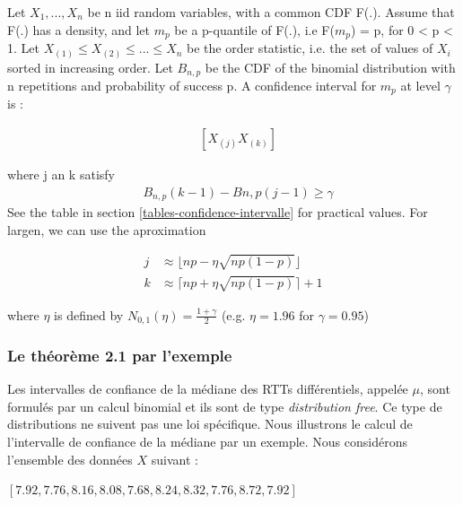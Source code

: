 \begin{tcolorbox}

\begin{theorem}
Let $X_1,..., X_n$ be n iid random variables, with a common CDF F(.). Assume that F(.) has a density, and let $m_p$ be a p-quantile of  F(.), i.e F($m_p$) = p, for 0 < p < 1.
Let $X_{(1)} \leq X_{(2)} \leq ... \leq X_{n}$ be the order statistic, i.e. the set of values of $X_i$ sorted in increasing order. Let $B_{n,p}$ be the CDF of the binomial distribution with n repetitions and probability of success p. A confidence interval for $m_p$ at level $\gamma$ is :


\begin{align*}
&[X_{(j)}X_{(k)}]
\end{align*}

where j an k satisfy 
\begin{align*}
&B_{n,p}(k−1)−B{n,p}(j−1)≥\gamma
\end{align*}
See the table in section \ref{tables-confidence-intervalle} for practical values. For largen, we can use the aproximation 

\begin{align}
j&\approx \lfloor np - \eta  \sqrt{np(1-p)}\rfloor \label{align:formule-j}\\
k&\approx \lceil np + \eta  \sqrt{np(1-p)}\rceil + 1 \label{align:formule-k}
\end{align}
	\label{the21}
	
	where $\eta$ is defined by $N_{0,1}(\eta) = \frac{1+ \gamma}{2}$ (e.g. $\eta = 1.96$ for $\gamma = 0.95$)
\end{theorem}
\end{tcolorbox}


\subsubsection{Le théorème 2.1 par l'exemple} \label{CI-theorem}

Les intervalles de confiance de la médiane des RTTs différentiels, appelée $\mu$, sont formulés par un calcul binomial et ils sont de type \textit{distribution free}. Ce type de distributions ne suivent pas une loi spécifique.
Nous illustrons le calcul de l'intervalle de confiance de la médiane par un exemple.  Nous considérons  l'ensemble des données $X$ suivant : 
\begin{center}
	$[7.92, 7.76, 8.16, 8.08, 7.68, 8.24, 8.32, 7.76, 8.72, 7.92]$
\end{center}


